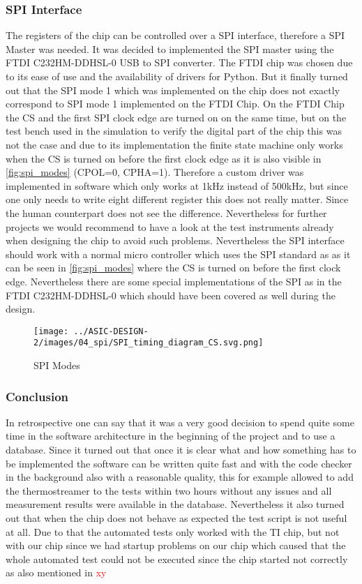\subsubsection{SPI Interface}
\label{subsubsec:SPI}
The registers of the chip can be controlled over a SPI interface, therefore a SPI Master was needed.
It was decided to implemented the SPI master using the FTDI C232HM-DDHSL-0 USB to SPI converter. The FTDI chip was chosen due to its ease of use and the availability of drivers for Python. But it finally turned out that the SPI mode 1 which was implemented on the chip does not exactly correspond to SPI mode 1 implemented on the FTDI Chip. On the FTDI Chip the CS and the first SPI clock edge are turned on on the same time, but on the test bench used in the simulation to verify the digital part of the chip this was not the case and due to its implementation the finite state machine only works when the CS is turned on before the first clock edge as it is also visible in \autoref{fig:spi_modes} (CPOL=0, CPHA=1). Therefore a custom driver was implemented in software which only works at 1kHz instead of 500kHz, but since one only needs to write eight different register this does not really matter. Since the human counterpart does not see the difference. Nevertheless for further projects we would recommend to have a look at the test instruments already when designing the chip to avoid such problems. Nevertheless the SPI interface should work with a normal micro controller which uses the SPI standard as as it can be seen in \autoref{fig:spi_modes} where the CS is turned on before the first clock edge. Nevertheless there are some special implementations of the SPI as in the FTDI C232HM-DDHSL-0 which should have been covered as well during the design.
\begin{figure}[h]
    \centering
    \texttt{[image: ../ASIC-DESIGN-2/images/04\_spi/SPI\_timing\_diagram\_CS.svg.png]}
    \caption{SPI Modes \cite{Wikipedia:SPI}}
    \label{fig:spi_modes}
\end{figure}
\subsubsection{Conclusion}
In retrospective one can say that it was a very good decision to spend quite some time in the software architecture in the beginning of the project and to use a database. Since it turned out that once it is clear what and how something has to be implemented the software can be written quite fast and with the code checker in the background also with a reasonable quality, this for example allowed to add the thermostreamer to the tests within two hours without any issues and all measurement results were available in the database. Nevertheless it also turned out that when the chip does not behave as expected the test script is not useful at all. Due to that the automated tests only worked with the TI chip, but not with our chip since we had startup problems on our chip which caused that the whole automated test could not be executed since the chip started not correctly as also mentioned in \textcolor{red}{xy}



